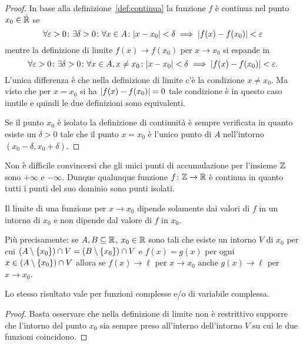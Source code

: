   \begin{proof}
  In base alla definizione~\ref{def:continua} la funzione $f$ è continua nel
  punto $x_0\in \bar {{\mathbb R}}$ se
  \[
   \forall \varepsilon>0 \colon \exists \delta >0 \colon
   \forall x \in A\colon
   {\left|x-x_0\right|}<\delta \implies {\left|f(x)-f(x_0)\right|} < \varepsilon
  \]
  mentre la definizione di limite $f(x)\to f(x_0)$ per $x\to x_0$
  si espande in
  \[
  \forall \varepsilon>0 \colon \exists \delta>0\colon
  \forall x \in A, x\neq x_0\colon
  {\left|x-x_0\right|}<\delta \implies {\left|f(x)-f(x_0)\right|} < \varepsilon.
  \]
  L'unica differenza è che nella definizione di limite
  c'è la condizione $x\neq x_0$. Ma visto che per $x=x_0$
  si ha ${\left|f(x)-f(x_0)\right|}=0$ tale condizione è in questo caso 
  inutile e quindi le due definizioni sono equivalenti.

  Se il punto $x_0$ è isolato la definizione di continuità
  è sempre verificata in quanto esiste un $\delta>0$ 
  tale che il punto $x=x_0$ è l'unico punto di $A$ 
  nell'intorno $(x_0-\delta,x_0+\delta)$.
  \end{proof}

\begin{example}
  Non è difficile convincersi che gli unici punti di accumulazione 
  per l'insieme ${\mathbb Z}$ sono $+\infty$ e $-\infty$.
  Dunque qualunque funzione $f\colon {\mathbb Z} \to {\mathbb R}$ è continua in quanto 
  tutti i punti del suo dominio sono punti isolati.
\end{example}
  
\begin{theorem}%
\label{th:localita_limite}%
Il limite di una funzione per $x\to x_0$ dipende solamente dai valori di $f$
in un intorno di $x_0$ e non dipende dal valore di $f$ in $x_0$.

Più precisamente: se $A,B\subseteq {\mathbb R}$, $x_0\in {\mathbb R}$ sono tali che 
esiste un intorno $V$ di $x_0$ per cui 
$(A\setminus{\left\{ x_0 \right\}}) \cap  V = (B\setminus {\left\{ x_0 \right\}}) \cap V$ 
e $f(x)=g(x)$ per ogni $x\in(A\setminus{\left\{ x_0 \right\}}) \cap  V$ 
allora se $f(x)\to \ell$ per $x\to x_0$ anche $g(x)\to \ell$ 
per $x\to x_0$.

Lo stesso risultato vale per funzioni complesse e/o di variabile complessa.
\end{theorem}
%
\begin{proof}
  Basta osservare che nella definizione di limite 
  non è restrittivo supporre che l'intorno del punto $x_0$ 
  sia sempre preso all'interno dell'intorno $V$ su cui 
  le due funzioni coincidono.
\end{proof}

